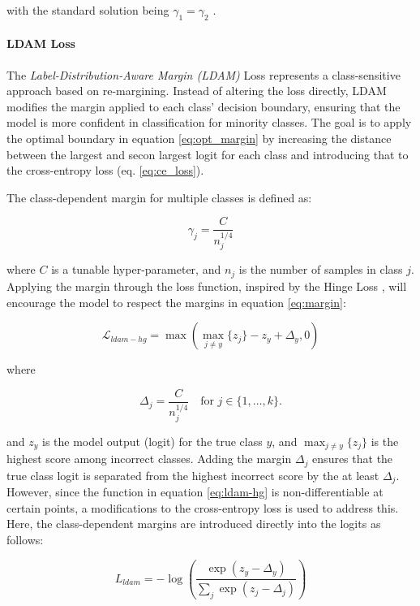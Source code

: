 with the standard solution being $\gamma_1=\gamma_2$ \cite{cao2019learningimbalanceddatasetslabeldistributionaware}.

\paragraph{LDAM Loss}
The \emph{Label-Distribution-Aware Margin (LDAM)} Loss \cite{cao2019learningimbalanceddatasetslabeldistributionaware} represents a class-sensitive approach based on re-margining. Instead of altering the loss directly, LDAM modifies the margin applied to each class’ decision boundary, ensuring that the model is more confident in classification for minority classes. The goal is to apply the optimal boundary in equation \eqref{eq:opt_margin} by increasing the distance between the largest and secon largest logit for each class and introducing that to the cross-entropy loss (eq. \eqref{eq:ce_loss}).


The class-dependent margin for multiple classes is defined as:

\begin{equation}
    \label{eq:margin}
    \gamma_j = \frac{C}{n^{1/4}_j}
\end{equation}

where $C$ is a tunable hyper-parameter, and $n_j$ is the number of samples in class $j$. Applying the margin through the loss function, inspired by the Hinge Loss , will encourage the model to respect the margins in equation \eqref{eq:margin}:

\begin{equation}
    \label{eq:ldam-hg}
    \mathcal{L}_{ldam-hg} = \max\left(\max_{j \neq y}\{z_j\} - z_y + \Delta_y, 0\right)
\end{equation}

where

\begin{equation}
    \Delta_j = \frac{C}{n_j^{1/4}} \quad \text{for } j \in \{1, \dots, k\}.
\end{equation}

and $z_y$ is the model output (logit) for the true class $y$, and $\max_{j \neq y}\{z_j\}$ is the highest score among incorrect classes. Adding the margin $\Delta_j$ ensures that the true class logit is separated from the highest incorrect score by the at least $\Delta_j$. However, since the function in equation \eqref{eq:ldam-hg} is non-differentiable at certain points, a modifications to the cross-entropy loss is used to address this. Here, the class-dependent margins are introduced directly into the logits as follows:

\begin{equation}
    \label{eq:ldam}
    L_{ldam} = - \log\left( \frac{\exp(z_y - \Delta_y)}{\sum_j \exp(z_j - \Delta_j)} \right)
\end{equation}